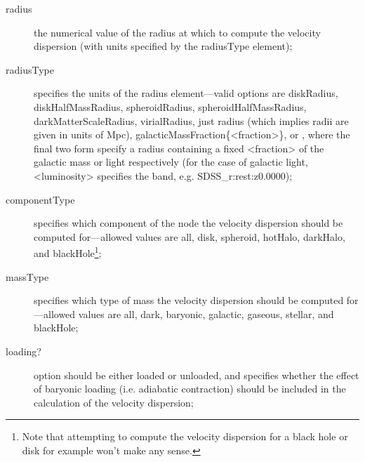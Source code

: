 \begin{description}
 \item [{\normalfont \ttfamily radius}] the numerical value of the radius at which to compute the velocity dispersion (with units specified by the {\normalfont \ttfamily radiusType} element);
 \item [{\normalfont \ttfamily radiusType}] specifies the units of the {\normalfont \ttfamily radius} element---valid options are {\normalfont \ttfamily diskRadius}, {\normalfont \ttfamily diskHalfMassRadius}, {\normalfont \ttfamily spheroidRadius}, {\normalfont \ttfamily spheroidHalfMassRadius}, {\normalfont \ttfamily darkMatterScaleRadius}, {\normalfont \ttfamily virialRadius}, just {\normalfont \ttfamily radius} (which implies radii are given in units of Mpc), {\normalfont \ttfamily galacticMassFraction\{\textless fraction\textgreater\}}, or , where the final two form specify a radius containing a fixed {\normalfont \ttfamily \textless fraction\textgreater} of the galactic mass or light respectively (for the case of galactic light, {\normalfont \ttfamily \textless luminosity\textgreater} specifies the band, e.g. {\normalfont \ttfamily SDSS\_r:rest:z0.0000});
 \item [{\normalfont \ttfamily componentType}] specifies which component of the node the velocity dispersion should be computed for---allowed values are {\normalfont \ttfamily all}, {\normalfont \ttfamily disk}, {\normalfont \ttfamily spheroid}, {\normalfont \ttfamily hotHalo}, {\normalfont \ttfamily darkHalo}, and {\normalfont \ttfamily blackHole}\footnote{Note that attempting to compute the velocity dispersion for a black hole or disk for example won't make any sense.};
 \item [{\normalfont \ttfamily massType}] specifies which type of mass the velocity dispersion should be computed for---allowed values are {\normalfont \ttfamily all}, {\normalfont \ttfamily dark}, {\normalfont \ttfamily baryonic}, {\normalfont \ttfamily galactic}, {\normalfont \ttfamily gaseous}, {\normalfont \ttfamily stellar}, and {\normalfont \ttfamily blackHole};
 \item [{\normalfont \ttfamily loading?}] option should be either {\normalfont \ttfamily loaded} or {\normalfont \ttfamily unloaded}, and specifies whether the effect of baryonic loading (i.e. adiabatic contraction) should be included in the calculation of the velocity dispersion;

\end{description}
